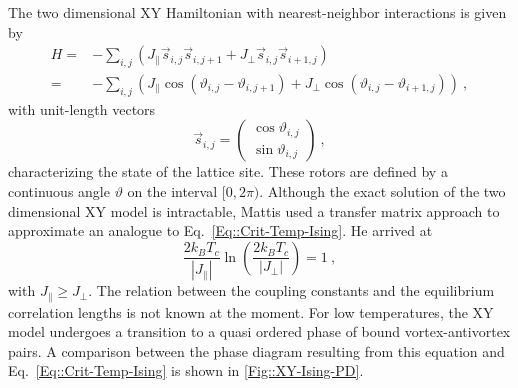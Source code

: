 	The two dimensional XY Hamiltonian with nearest-neighbor interactions is given by
	\begin{equation} \label{Eq::XY-isotropic}
		\begin{split}
			H =&- \sum_{i,j}^{} \left(J_\parallel \vec{s}_{i,j} \vec{s}_{i,j + 1} + J_\perp  \vec{s}_{i,j} \vec{s}_{i + 1,j} \right)   \\
			=&- \sum_{i,j}^{} \left(J_\parallel  \cos \left(\vartheta_{i,j} - \vartheta_{i, j+1} \right) + J_\perp  \cos \left(\vartheta_{i,j} - \vartheta_{i+1, j} \right) \right)	 ~,
		\end{split}
	\end{equation}
	with unit-length vectors
	\begin{equation}
		\vec{s}_{i, j} =	\left(\begin{array}{c}
			\cos \vartheta_{i, j} \\
			\sin \vartheta_{i, j}
		\end{array}\right) ~,
	\end{equation}
	characterizing the state of the lattice site. These rotors are defined by a continuous angle $\vartheta$ on the interval $[0, 2\pi)$. Although the exact solution of the two dimensional XY model is intractable, Mattis \cite{mattis1984transfer} used a transfer matrix approach to approximate an analogue to Eq.~\eqref{Eq::Crit-Temp-Ising}. He arrived at
	\begin{equation} \label{Eq::Crit-Temp-XY}
		\frac{2 k_B T_c}{|J_\parallel|} \ln \left(\frac{2 k_B T_c}{|J_\perp|}\right) =	1 ~, 
	\end{equation}
	with $J_\parallel \geq J_\perp$. The relation between the coupling constants and the equilibrium correlation lengths is not known at the moment. For low temperatures, the XY model undergoes a transition to a quasi ordered phase of bound vortex-antivortex pairs. A comparison between the phase diagram resulting from this equation and Eq.~\eqref{Eq::Crit-Temp-Ising} is shown in \autoref{Fig::XY-Ising-PD}.\\
